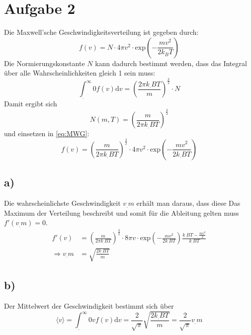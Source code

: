 \section{Aufgabe 2}
\label{sec:Aufgabe2}
Die Maxwell'sche Geschwindigkeitsverteilung ist gegeben durch:
\begin{equation}
  f(v)=N\cdot 4\pi v^2 \cdot \text{exp}\left(-\frac{mv^2}{2k_BT}\right)\label{eq:MWG}
\end{equation}
Die Normierungskonstante $N$ kann dadurch bestimmt werden, dass das Integral über alle Wahrscheinlichkeiten gleich 1 sein muss:
\begin{equation}
  \int^{\infty}_.{0} f(v) \text{d}v = \left(\frac{2\pi k_.B T}{m}\right)^{\frac{3}{2}}\cdot N
\end{equation}
Damit ergibt sich
\begin{equation}
  N(m,T)= \left(\frac{m}{2\pi k_.B T}\right)^{\frac{3}{2}}
\end{equation}
und einsetzen in \eqref{eq:MWG}:
\begin{equation}
  f(v)=\left(\frac{m}{2\pi k_.B T}\right)^{\frac{3}{2}}\cdot 4\pi v^2 \cdot \text{exp}\left(-\frac{mv^2}{2k_.BT}\right)
\end{equation}

\subsection*{a)}

Die wahrscheinlichste Geschwindigkeit $v_.m$ erhält man daraus, dass diese Das Maximum der Verteilung beschreibt und somit für die Ableitung gelten muss $f'(v_.m)=0$. 
\begin{align*}
  f'(v) &= \left(\frac{m}{2\pi k_.B T}\right)^{\frac{3}{2}}\cdot 8\pi v \cdot \text{exp}\left(-\frac{mv^2}{2k_.BT}\right)\frac{k_.BT-\frac{mv^2}{2}}{k_.BT}\\
\Rightarrow v_.m &= \sqrt{\frac{2k_.BT}{m}}
\end{align*}


\subsection*{b)}
Der Mittelwert der Geschwindigkeit bestimmt sich über
\begin{equation}
  \langle v \rangle = \int^{\infty}_.{0} v f(v) \text{d}v = \frac{2}{\sqrt{\pi}}\sqrt{\frac{2k_.BT}{m}} = \frac{2}{\sqrt{\pi}} v_.m
\end{equation}

